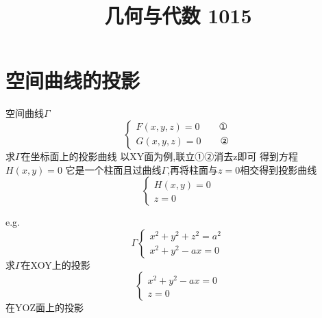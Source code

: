 \documentclass[UTF8,11pt]{ctexart}
\title{几何与代数 1015}
\date{}
\theoremstyle{cnthm}
\begin{document}
\maketitle

\section{空间曲线的投影}

空间曲线$\Gamma$
\[
\left \{ \begin{aligned}
F(x,y,z) = 0 \qquad \text{①} \\
G(x,y,z) = 0 \qquad \text{②}
\end{aligned} \right.
\]
求$\Gamma$在坐标面上的投影曲线
以XY面为例,联立①②消去z即可
得到方程$H(x,y)=0$
它是一个柱面且过曲线$\Gamma$,再将柱面与$z=0$相交得到投影曲线
\[
\left \{ \begin{aligned}
H(x,y) = 0 \\
z = 0 
\end{aligned} \right.
\]

e.g.
\[
\Gamma \left \{ \begin{aligned}
x^2 + y^2 + z^2 = a^2\\
x^2 + y^2 -ax = 0
\end{aligned} \right.
\]
求$\Gamma$在XOY上的投影
\[
\left \{ \begin{aligned}
x^2 + y^2 - ax = 0 \\
z = 0
\end{aligned} \right.
\]
在YOZ面上的投影
\end{document}

